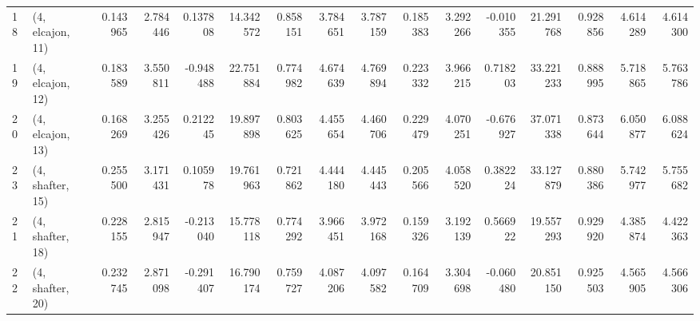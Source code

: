 \begin{tabular}{llrrrrrrrrrrrrrr}
18 &  (4, elcajon, 11) &   0.143965 &  2.784446 &  0.137808 &  14.342572 &  0.858151 &   3.784651 &  3.787159 &  0.185383 &  3.292266 & -0.010355 &   21.291768 &  0.928856 &   4.614289 &   4.614300 \\
19 &  (4, elcajon, 12) &   0.183589 &  3.550811 & -0.948488 &  22.751884 &  0.774982 &   4.674639 &  4.769894 &  0.223332 &  3.966215 &  0.718203 &   33.221233 &  0.888995 &   5.718865 &   5.763786 \\
20 &  (4, elcajon, 13) &   0.168269 &  3.255426 &  0.212245 &  19.897898 &  0.803625 &   4.455654 &  4.460706 &  0.229479 &  4.070251 & -0.676927 &   37.071338 &  0.873644 &   6.050877 &   6.088624 \\
23 &  (4, shafter, 15) &   0.255500 &  3.171431 &  0.105978 &  19.761963 &  0.721862 &   4.444180 &  4.445443 &  0.205566 &  4.058520 &  0.382224 &   33.127879 &  0.880386 &   5.742977 &   5.755682 \\
21 &  (4, shafter, 18) &   0.228155 &  2.815947 & -0.213040 &  15.778118 &  0.774292 &   3.966451 &  3.972168 &  0.159326 &  3.192139 &  0.566922 &   19.557293 &  0.929920 &   4.385874 &   4.422363 \\
22 &  (4, shafter, 20) &   0.232745 &  2.871098 & -0.291407 &  16.790174 &  0.759727 &   4.087206 &  4.097582 &  0.164709 &  3.304698 & -0.060480 &   20.851150 &  0.925503 &   4.565905 &   4.566306 \\
\bottomrule
\end{tabular}
